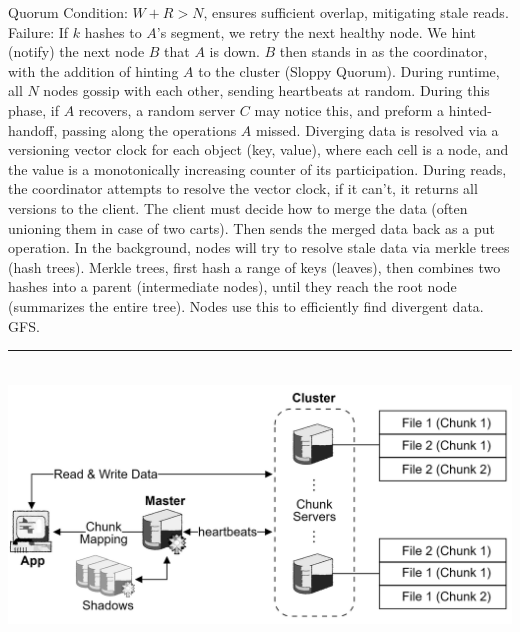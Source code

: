 \begin{multicols}{2}
Quorum Condition: $W+R > N$, ensures sufficient overlap, mitigating stale reads. Failure:
If $k$ hashes to $A$'s segment, we retry the next healthy node. We hint (notify) the next node $B$ that $A$ is down. $B$ then stands in as 
the coordinator, with the addition of hinting $A$ to the cluster (Sloppy Quorum). During runtime, all $N$ nodes gossip with each other, sending heartbeats at random. During this phase,
if $A$ recovers, a random server $C$ may notice this, and preform a hinted-handoff, passing along the operations $A$ missed. Diverging data is 
resolved via a versioning vector clock for each object (key, value), where each cell is a node, and the value is a monotonically increasing counter of its participation.
During reads, the coordinator attempts to resolve the vector clock, if it can't, it returns all versions to the client. The client must decide how to merge the data (often unioning them in case of two carts).
Then sends the merged data back as a put operation. In the background, nodes will try to resolve stale data via merkle trees (hash trees). Merkle trees, first hash a range of keys (leaves), then combines two 
hashes into a parent (intermediate nodes), until they reach the root node (summarizes the entire tree). Nodes use this to efficiently find divergent data. GFS.

\noindent
\rule{\linewidth}{0.4pt}\\

\hspace{-1.5em}
\includegraphics[width=\linewidth]{Sections/gfs/high.png}\\


\end{multicols}


